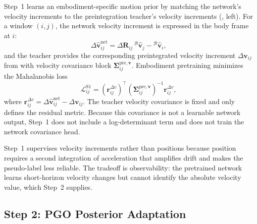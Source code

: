 Step~1 learns an embodiment-specific motion prior by matching the network's velocity increments to the preintegration teacher's velocity increments (, left).
For a window $(i,j)$, the network velocity increment is expressed in the body frame at $i$:
\begin{equation}
\Delta \hat{\mathbf{v}}^{\mathrm{net}}_{ij}
=
\Delta\mathbf{R}_{ij}\,{}^\mathcal{B}\hat{\mathbf{v}}_j-{}^\mathcal{B}\hat{\mathbf{v}}_i,
\end{equation}
and the teacher provides the corresponding preintegrated velocity increment $\Delta\mathbf{v}_{ij}$ from  with velocity covariance block $\boldsymbol{\Sigma}^{\mathrm{pre},\mathbf{v}}_{ij}$.
Embodiment pretraining minimizes the Mahalanobis loss
\begin{equation}
\label{eq:macio:consistency_loss}
\mathcal{L}^{\mathrm{S1}}_{ij}
=
(\mathbf{r}^{\Delta v}_{ij})^{\top}
\left(\boldsymbol{\Sigma}^{\mathrm{pre},\mathbf{v}}_{ij}\right)^{-1}
\mathbf{r}^{\Delta v}_{ij},
\end{equation}
where $\mathbf{r}^{\Delta v}_{ij}=\Delta\hat{\mathbf{v}}^{\mathrm{net}}_{ij}-\Delta\mathbf{v}_{ij}$.
The teacher velocity covariance is fixed and only defines the residual metric.
Because this covariance is not a learnable network output, Step~1 does not include a log-determinant term and does not train the network covariance head.

Step~1 supervises velocity increments rather than positions because position requires a second integration of acceleration that amplifies drift and makes the pseudo-label less reliable.
The tradeoff is observability: the pretrained network learns short-horizon velocity changes but cannot identify the absolute velocity value, which Step~2 supplies.

\subsection{Step 2: PGO Posterior Adaptation}
\label{sec:macio:m2}

